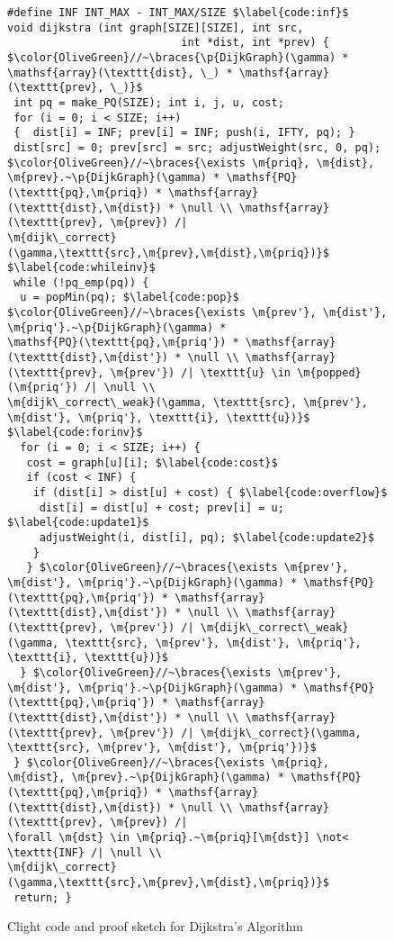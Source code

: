 
\begin{figure}[t]

\begin{lstlisting}[mathescape=true,showlines=true]
#define INF INT_MAX - INT_MAX/SIZE $\label{code:inf}$
void dijkstra (int graph[SIZE][SIZE], int src,
                           int *dist, int *prev) {
$\color{OliveGreen}//~\braces{\p{DijkGraph}(\gamma) *
\mathsf{array}(\texttt{dist}, \_) * \mathsf{array}(\texttt{prev}, \_)}$
 int pq = make_PQ(SIZE); int i, j, u, cost;
 for (i = 0; i < SIZE; i++)
 {  dist[i] = INF; prev[i] = INF; push(i, IFTY, pq); }
 dist[src] = 0; prev[src] = src; adjustWeight(src, 0, pq);
$\color{OliveGreen}//~\braces{\exists \m{priq}, \m{dist}, \m{prev}.~\p{DijkGraph}(\gamma) * \mathsf{PQ}(\texttt{pq},\m{priq}) * \mathsf{array}(\texttt{dist},\m{dist}) * \null \\ \mathsf{array}(\texttt{prev}, \m{prev}) /|
\m{dijk\_correct}(\gamma,\texttt{src},\m{prev},\m{dist},\m{priq})}$ $\label{code:whileinv}$
 while (!pq_emp(pq)) {
  u = popMin(pq); $\label{code:pop}$
$\color{OliveGreen}//~\braces{\exists \m{prev'}, \m{dist'}, \m{priq'}.~\p{DijkGraph}(\gamma) *
\mathsf{PQ}(\texttt{pq},\m{priq'}) * \mathsf{array}(\texttt{dist},\m{dist'}) * \null \\ \mathsf{array}(\texttt{prev}, \m{prev'}) /| \texttt{u} \in \m{popped}(\m{priq'}) /| \null \\
\m{dijk\_correct\_weak}(\gamma, \texttt{src}, \m{prev'}, \m{dist'}, \m{priq'}, \texttt{i}, \texttt{u})}$ $\label{code:forinv}$
  for (i = 0; i < SIZE; i++) {
   cost = graph[u][i]; $\label{code:cost}$
   if (cost < INF) {
    if (dist[i] > dist[u] + cost) { $\label{code:overflow}$
     dist[i] = dist[u] + cost; prev[i] = u; $\label{code:update1}$ 
     adjustWeight(i, dist[i], pq); $\label{code:update2}$
    }
   } $\color{OliveGreen}//~\braces{\exists \m{prev'}, \m{dist'}, \m{priq'}.~\p{DijkGraph}(\gamma) * \mathsf{PQ}(\texttt{pq},\m{priq'}) * \mathsf{array}(\texttt{dist},\m{dist'}) * \null \\ \mathsf{array}(\texttt{prev}, \m{prev'}) /| \m{dijk\_correct\_weak}(\gamma, \texttt{src}, \m{prev'}, \m{dist'}, \m{priq'}, \texttt{i}, \texttt{u})}$
  } $\color{OliveGreen}//~\braces{\exists \m{prev'}, \m{dist'}, \m{priq'}.~\p{DijkGraph}(\gamma) * \mathsf{PQ}(\texttt{pq},\m{priq'}) * \mathsf{array}(\texttt{dist},\m{dist'}) * \null \\ \mathsf{array}(\texttt{prev}, \m{prev'}) /| \m{dijk\_correct}(\gamma, \texttt{src}, \m{prev'}, \m{dist'}, \m{priq'})}$
 } $\color{OliveGreen}//~\braces{\exists \m{priq}, \m{dist}, \m{prev}.~\p{DijkGraph}(\gamma) * \mathsf{PQ}(\texttt{pq},\m{priq}) * \mathsf{array}(\texttt{dist},\m{dist}) * \null \\ \mathsf{array}(\texttt{prev}, \m{prev}) /|
\forall \m{dst} \in \m{priq}.~\m{priq}[\m{dst}] \not< \texttt{INF} /| \null \\
\m{dijk\_correct}(\gamma,\texttt{src},\m{prev},\m{dist},\m{priq})}$
 return; }
\end{lstlisting}
\vspace{-1em}
\caption{Clight code and proof sketch for Dijkstra's Algorithm}
\vspace{-1em}
\label{fig:decorated}
\end{figure} 